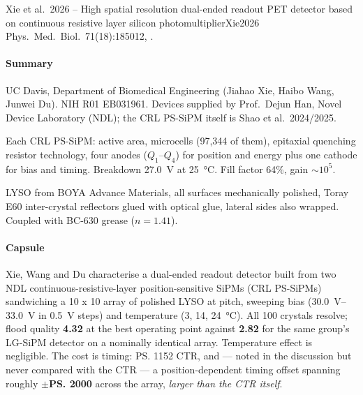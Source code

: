 \begin{papernote}{Xie et al.\ 2026 -- High spatial resolution dual-ended readout PET detector based on continuous resistive layer silicon photomultiplier}{Xie2026}
Phys.\ Med.\ Biol.\ 71(18):185012, .

\paragraph{Summary}
UC Davis, Department of Biomedical Engineering (Jiahao Xie, Haibo Wang, Junwei
Du). NIH R01 EB031961. Devices supplied by Prof.\ Dejun Han, Novel Device
Laboratory (NDL); the CRL PS-SiPM itself is Shao et al.\ 2024/2025.
 
Each CRL PS-SiPM:  active area,
 microcells (97{,}344 of them), epitaxial quenching resistor technology,
four anodes ($Q_1$--$Q_4$) for position and energy plus one cathode for bias and
timing. Breakdown \qty{27.0}{\volt} at \qty{25}{\degreeCelsius}. Fill factor
64\%, gain $\sim$$10^5$.
 
LYSO from BOYA Advance Materials, all surfaces mechanically polished,
 Toray E60 inter-crystal reflectors glued with  optical glue,
lateral sides also wrapped. Coupled with BC-630 grease ($n = 1.41$).
 
\paragraph{Capsule}
Xie, Wang and Du \cite{Xie2026} characterise a dual-ended readout detector built
from two NDL continuous-resistive-layer position-sensitive SiPMs (CRL PS-SiPMs)
sandwiching a 10 x 10 array of 
polished LYSO at  pitch, sweeping bias (\qtyrange{30.0}{33.0}{\volt} in
\qty{0.5}{\volt} steps) and temperature (3, 14, \qty{24}{\degreeCelsius}). All
100 crystals resolve; flood quality \textbf{4.32} at the best operating point
against \textbf{2.82} for the same group's LG-SiPM detector on a nominally
identical array. Temperature effect is negligible. The cost is timing:
\ps{1152} CTR, and --- noted in the discussion but never compared with the
CTR --- a position-dependent
timing offset spanning roughly \textbf{$\pm$\ps{2000}} across the array,
\emph{larger than the CTR itself}.
 

\end{papernote}
